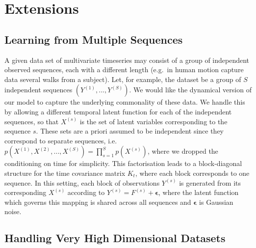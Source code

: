 
\section{\label{section:extensions} Extensions}
\subsection{Learning from Multiple Sequences \label{sequences}}

A given data set of multivariate timeseries
may consist of a group of independent observed sequences, each with
a different length (e.g.\ in human motion capture data several walks
from a subject). Let, for example, the dataset be a group of
$S$ independent sequences  $\left( Y^{(1)}, ..., Y^{(S)} \right)$. We would like the dynamical version of our
model to capture the underlying
commonality of these data. We handle this by allowing a different temporal latent function for each of the independent
sequences, so that $X^{(s)}$ is the set of latent variables corresponding to the sequence $s$.
%
These sets are a priori assumed to be independent since they correspond to separate sequences,
i.e.\ $p\left( X^{(1)}, X^{(2)}, ..., X^{(S)} \right) = \prod_{s=1}^S p(X^{(s)})$, where we dropped the
conditioning on time for simplicity.
%
This factorisation leads to a block-diagonal structure for the time covariance matrix $K_t$, where each block corresponds to one sequence.
 In this setting, each block of observations $Y^{(s)}$ is generated from its corresponding $X^{(s)}$
according to $Y^{(s)} = F^{(s)} + \boldsymbol \epsilon$, where the latent function which governs this mapping is shared across all sequences and 
$\boldsymbol \epsilon$ is Gaussian noise. 


\subsection{Handling Very High Dimensional Datasets}

